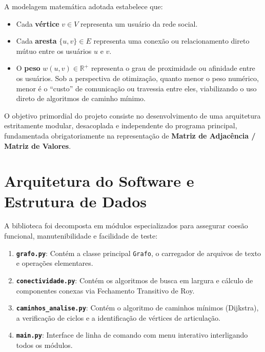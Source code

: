 \documentclass[12pt,a4paper]{article}
\begin{document}
A modelagem matemática adotada estabelece que:
\begin{itemize}
    \item Cada \textbf{vértice} $v \in V$ representa um usuário da rede social.
    \item Cada \textbf{aresta} $\{u, v\} \in E$ representa uma conexão ou relacionamento direto mútuo entre os usuários $u$ e $v$.
    \item O \textbf{peso} $w(u, v) \in \mathbb{R}^+$ representa o grau de proximidade ou afinidade entre os usuários. Sob a perspectiva de otimização, quanto menor o peso numérico, menor é o ``custo'' de comunicação ou travessia entre eles, viabilizando o uso direto de algoritmos de caminho mínimo.
\end{itemize}

O objetivo primordial do projeto consiste no desenvolvimento de uma arquitetura estritamente modular, desacoplada e independente do programa principal, fundamentada obrigatoriamente na representação de \textbf{Matriz de Adjacência / Matriz de Valores}.

\section{Arquitetura do Software e Estrutura de Dados}

A biblioteca foi decomposta em módulos especializados para assegurar coesão funcional, manutenibilidade e facilidade de teste:
\begin{enumerate}
    \item \textbf{\texttt{grafo.py}}: Contém a classe principal \texttt{Grafo}, o carregador de arquivos de texto e operações elementares.
    \item \textbf{\texttt{conectividade.py}}: Contém os algoritmos de busca em largura e cálculo de componentes conexas via Fechamento Transitivo de Roy.
    \item \textbf{\texttt{caminhos\_analise.py}}: Contém o algoritmo de caminhos mínimos (Dijkstra), a verificação de ciclos e a identificação de vértices de articulação.
    \item \textbf{\texttt{main.py}}: Interface de linha de comando com menu interativo interligando todos os módulos.
\end{enumerate}
\end{document}
